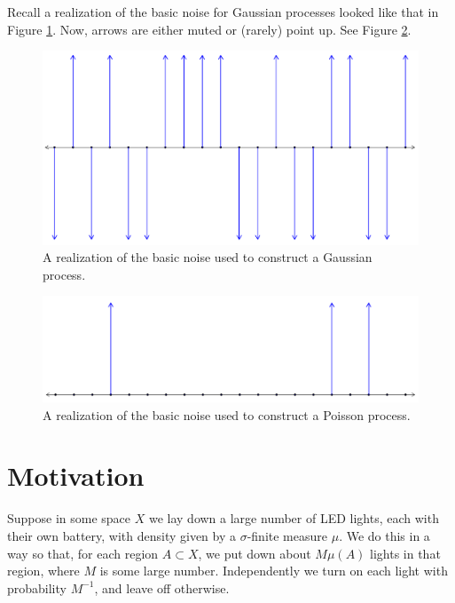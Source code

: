 \documentclass[../../../Master/AppliedStochastics.tex]{subfiles}
\author{Matt}
\date{01 October 2018}
\begin{document}
%


\makelecture


Recall a realization of the basic noise for Gaussian processes looked like that 
in Figure \ref{fig:gaussnoise}. Now, arrows are either muted or (rarely) point 
up. See Figure \ref{fig:poisnoise}.
\begin{figure}
	\centering
	\includegraphics[width=0.9\linewidth]{gauss_noise}
	\caption{A realization of the basic noise used to construct a Gaussian 
	process.}
	\label{fig:gaussnoise}
\end{figure}
\begin{figure}
	\centering
	\includegraphics[width=0.9\linewidth]{pois_noise}
	\caption{A realization of the basic noise used to construct a Poisson 
	process.}
	\label{fig:poisnoise}
\end{figure}

\section{Motivation}
Suppose in some space $X$ we lay down a large number of LED lights, each with 
their own battery, with density given by a $\sigma$-finite measure $\mu$. We do 
this in a way so that, for each region $A\subset X$, we put down about 
$M\mu(A)$ lights in that region, where $M$ is some large number. Independently 
we turn on each light with probability $M^{-1}$, and leave off otherwise.
\end{document}
